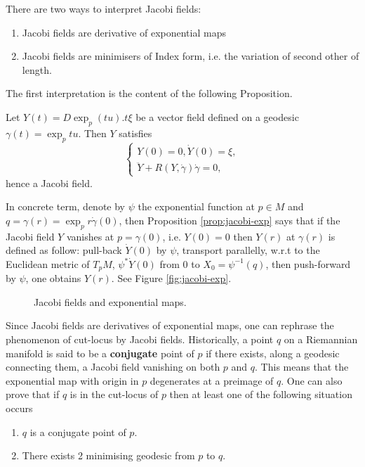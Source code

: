 \documentclass[11pt]{article}
\begin{document}
There are two ways to interpret Jacobi fields:
\begin{enumerate}
\item Jacobi fields are derivative of exponential maps
\item Jacobi fields are minimisers of Index form, i.e. the variation of second other of
length.
\end{enumerate}

The first interpretation is the content of the following Proposition.

\begin{proposition}
\label{prop:jacobi-exp}
Let \(Y(t) = D \exp_p(tu). t\xi\) be a vector field defined on a geodesic \(\gamma(t) =
\exp_p tu\). Then \(Y\) satisfies
\begin{equation}
\label{eq:jacobi-exp}
\begin{cases}
Y(0) = 0, \dot Y(0) = \xi,  \\
\ddot Y + R(Y,\dot \gamma)\dot\gamma = 0,
\end{cases}
\end{equation}
hence a Jacobi field.
\end{proposition}

In concrete term, denote by \(\psi\) the exponential function at \(p\in M\) and \(q=\gamma(r) = \exp_p r\dot\gamma(0)\), then
Proposition \ref{prop:jacobi-exp} says that if the Jacobi field \(Y\) vanishes at
\(p =\gamma(0)\), i.e. \(Y(0) = 0\) then \(Y(r)\) at \(\gamma(r)\) is defined as
follow: pull-back \(\dot Y (0)\) by \(\psi\), transport parallelly, w.r.t to the Euclidean
metric of \(T_pM\), \(\psi^*\dot Y(0)\)
from \(0\) to \(X_0 = \psi^{-1} (q)\), then push-forward by \(\psi\), one obtains \(Y(r)\). See Figure \ref{fig:jacobi-exp}.

\label{fig:jacobi-exp}
\begin{figure}[htbp]
\centering
\caption{Jacobi fields and exponential maps.}
\end{figure} 



Since Jacobi fields are derivatives of exponential maps, one can rephrase the phenomenon
of cut-locus by Jacobi fields. Historically, a point \(q\) on a Riemannian manifold
is said to be a \textbf{conjugate} point of \(p\) if there exists, along a geodesic connecting them, a Jacobi
field vanishing on both \(p\) and \(q\). This means that the exponential map with
origin in \(p\) degenerates at a preimage of \(q\). One can also prove that if \(q\)
is in the cut-locus of \(p\) then at least one of the following situation occurs
\begin{enumerate}
\item \(q\) is a conjugate point of \(p\).
\item There exists 2 minimising geodesic from \(p\) to \(q\).
\end{enumerate}
\end{document}
